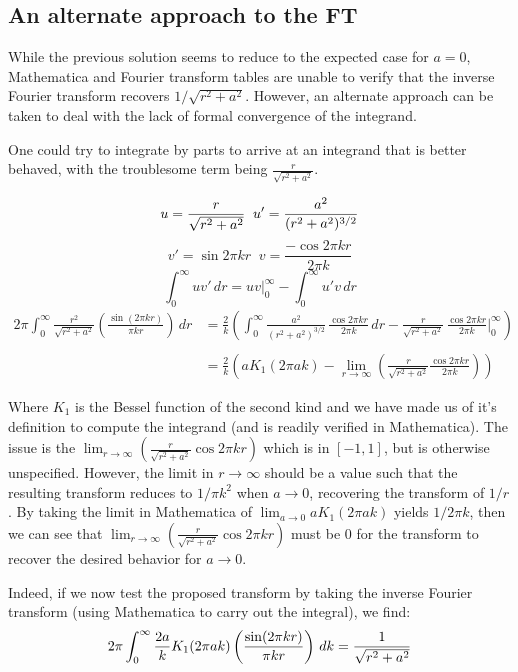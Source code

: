 \documentclass[letterpaper,10pt]{article}
\begin{document}
\subsection*{An alternate approach to the FT}
While the previous solution seems to reduce to the expected case for $a=0$, Mathematica and Fourier transform tables are unable to verify that the inverse Fourier transform recovers $1/\sqrt{r^2 + a^2}$. However, an alternate approach can be taken to deal with the lack of formal convergence of the integrand.

One could try to integrate by parts to arrive at an integrand that is better behaved, with the troublesome term being $\frac{r}{\sqrt{r^2+a^2}}$.

$$
u = \frac{r}{\sqrt{r^2+a^2}} \;\; u' = \frac{a^2}{(r^2+a^2)^{3/2}}\\\\
$$
$$
v' = \sin{2 \pi k r} \;\; v = \frac{- \cos{2 \pi k r}}{2 \pi k}
$$
$$
\int_0^\infty uv' \,dr = uv\Big|_0^\infty - \int_0^\infty u' v \,dr
$$
\begin{align*}
2\pi \int_0^\infty \frac{r^2}{\sqrt{r^2+a^2}}\left(\frac{\sin(2\pi kr)}{\pi k r}\right)\,dr &= \frac{2}{k}\left( \int_0^\infty \frac{a^2}{(r^2+a^2)^{3/2}}\, \frac{\cos{2 \pi k r}}{2 \pi k}\,dr - 
\frac{r}{\sqrt{r^2+a^2}} \, \frac{ \cos{2 \pi k r}}{2 \pi k} \Big|_0^\infty \right) \\\\
&=\frac{2}{k} \left( a K_1(2 \pi a k) - \lim_{r \to \infty}\left( \frac{r}{\sqrt{r^2+a^2}} \frac{\cos{2 \pi k r}}{2 \pi k} \right) \right) 
\end{align*}

Where $K_1$ is the Bessel function of the second kind and we have made us of it's definition to compute the integrand (and is readily verified in Mathematica).
The issue is the $\lim_{r \to \infty}\left( \frac{r}{\sqrt{r^2+a^2}} \cos{2 \pi k r}\right)$ which is in $[-1,1]$, but is otherwise unspecified. However, the limit  in $r \to \infty$ should be a value such that the resulting transform reduces to $1/\pi k^2$ when $a \to 0$, recovering the transform of $1/r$. By taking the limit in Mathematica of $\lim_{a \to 0} a K_1(2 \pi a k)$ yields $1/2 \pi k$, then we can see that $\lim_{r \to \infty}\left( \frac{r}{\sqrt{r^2+a^2}} \cos{2 \pi k r}\right)$ must be 0 for the transform to recover the desired behavior for $a \to 0$.

Indeed, if we now test the proposed transform by taking the inverse Fourier transform (using Mathematica to carry out the integral), we find:
$$
2\pi \int_0^\infty \frac{2a}{k} K_1(2 \pi a k) \left(\frac{\sin(2\pi kr)}{\pi k r}\right)\,dk = \frac{1}{\sqrt{r^2+a^2}}\\\\
$$
\end{document}
